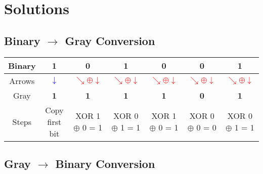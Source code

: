 



\section*{Solutions}

\subsection*{Binary $\to$ Gray Conversion}


\begin{center}
\renewcommand{\arraystretch}{1.3}
\begin{tabular}{|c|*6{c|}}
  \hline
    Binary &
    1 &    0 &    1 &    0 &    0 &    1  \\
  \hline

  Arrows &
      \textcolor{blue}{$\downarrow$} &
        \textcolor{red}{$\searrow \oplus \downarrow$} &        \textcolor{red}{$\searrow \oplus \downarrow$} &        \textcolor{red}{$\searrow \oplus \downarrow$} &        \textcolor{red}{$\searrow \oplus \downarrow$} &        \textcolor{red}{$\searrow \oplus \downarrow$}  \\
  \hline

    Gray &
    \textbf{ 1 } &    \textbf{ 1 } &    \textbf{ 1 } &    \textbf{ 1 } &    \textbf{ 0 } &    \textbf{ 1 }  \\
  \hline

  Steps &
    {\scriptsize Copy first bit } &    {\scriptsize XOR 1 $\oplus$ 0 = 1 } &    {\scriptsize XOR 0 $\oplus$ 1 = 1 } &    {\scriptsize XOR 1 $\oplus$ 0 = 1 } &    {\scriptsize XOR 0 $\oplus$ 0 = 0 } &    {\scriptsize XOR 0 $\oplus$ 1 = 1 }  \\
  \hline
\end{tabular}
\end{center}

\bigskip

\subsection*{Gray $\to$ Binary Conversion}

